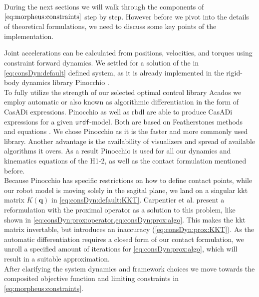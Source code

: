 During the next sections we will walk through the components of $\cref{eq:morpheus:constraints}$ step by step.
However before we pivot into the details of theoretical formulations, we need to discuss some key points of the implementation.
\par
Joint accelerations can be calculated from positions, velocities, and torques using constraint forward dynamics.
We settled for a solution of the in \cref{eq:consDyn:default} defined system, as it is already implemented in the rigid-body dynamics library Pinocchio \cite{pinocchioweb,carpentier2019pinocchio}.
\\
To fully utilize the strength of our selected optimal control library Acados \cite{verschueren_2021} we employ automatic or also known as algorithmic differentiation in the form of CasADi \cite{andersson2019} expressions.
Pinocchio \cite{carpentier2019pinocchio,pinocchioweb} as well as \acrfull{rbdl} \cite{Felis2016} are able to produce CasADi expressions for a given \verb|urdf|-model.
Both are based on Featherstones methods and equations \cite{featherstone_2008}.
We chose Pinocchio as it is the faster \cite{carpentier2019pinocchio} and more commonly used library.
Another advantage is the availability of visualizers and spread of available algorithms it overs.
As a result Pinocchio is used for all our dynamics and kinematics equations of the H1-2, as well as the contact formulation mentioned before.
\\
Because Pinocchio has specific restrictions on how to define contact points, while our robot model is moving solely in the sagital plane, we land on a singular \acrshort{kkt} matrix $K(\bm q)$ in \cref{eq:consDyn:default:KKT}.
Carpentier et al. \cite{carpentier_2021} present a reformulation with the proximal operator as a solution to this problem, like shown in \cref{eq:consDyn:prox:operator,eq:consDyn:prox:algo}.
This makes the \acrshort{kkt} matrix invertable, but introduces an inaccuracy (\cref{eq:consDyn:prox:KKT}).
As the automatic differentiation requires a closed form of our contact formulation, we unroll a specified amount of iterations for \cref{eq:consDyn:prox:algo}, which will result in a suitable approximation.
\\
After clarifying the system dynamics and framework choices we move towards the composited objective function and limiting constraints in \cref{eq:morpheus:constraints}.

